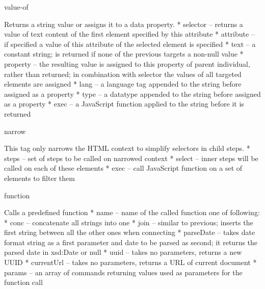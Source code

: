 \secc value-of

Returns a string value or assigns it to a data property. 
\begitems
  * selector -- returns a value of text content of the first element specified by this attribute
  * attribute -- if specified a value of this attribute of the selected element is specified
  * text -- a constant string; is returned if none of the previous targets a non-null value
  * property -- the resulting value is assigned to this property of parent
  individual, rather than returned; in combination with selector the values of all
  targeted elements are assigned
  * lang -- a language tag appended to the string before assigned as a property
  * type -- a datatype appended to the string  before assigned as a property
  * exec -- a JavaScript function applied to the string before it is returned
\enditems


\secc narrow

This tag only narrows the HTML context to simplify selectors in child steps. 
\begitems
  * steps -- set of steps to be called on narrowed context
  * select -- inner steps will be called on each of these elements
  * exec -- call JavaScript function on a set of elements to filter them
\enditems

\secc function

Calls a predefined function
\begitems
  * name -- name of the called function one of following: 
  \begitems
    * conc -- concatenate all strings into one
    * join -- similar to previous; inserts the first string between all the other ones when connecting
    * parseDate -- takes date format string as a first parameter and date to be parsed as second; 
              it returns the parsed date in xsd:Date or null
    * uuid -- takes no parameters, returns a new UUID
    * currentUrl -- takes no parameters, returns a URL of current document
  \enditems
  * params -- an array of commands returning values used as parameters for the function call
\enditems


